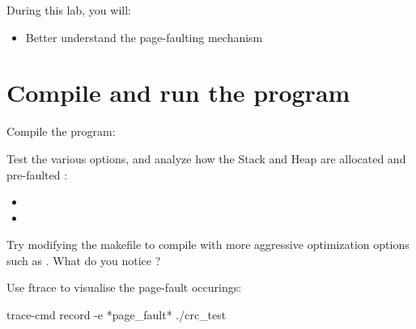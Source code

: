 
During this lab, you will:
\begin{itemize}
  \item Better understand the page-faulting mechanism
\end{itemize}

\section{Compile and run the program}

Compile the  program: 

Test the various options, and analyze how the Stack and Heap are allocated and
pre-faulted :

\begin{itemize}
	\item {}
	\item {}
\end{itemize}

Try modifying the makefile to compile with more aggressive optimization options
such as . What do you notice ?

Use ftrace to visualise the page-fault occurings:
\begin{bashinput}
	trace-cmd record -e *page_fault* ./crc_test
\end{bashinput}

